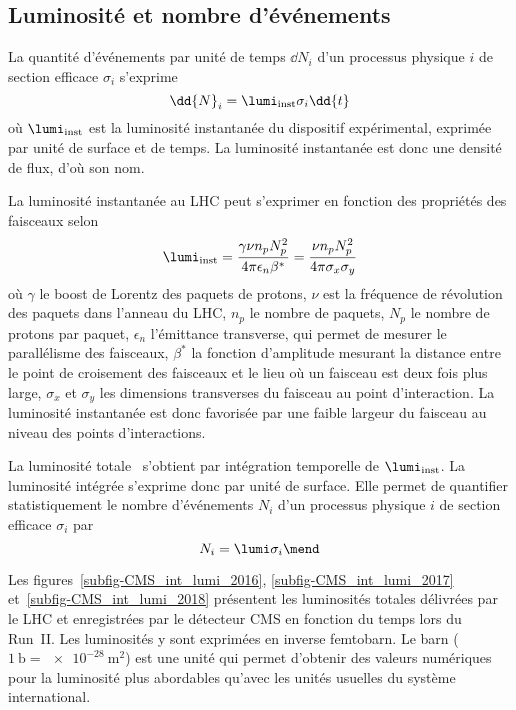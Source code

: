 \subsection{Luminosité et nombre d'événements}\label{chapter-LHC-section-LHC-subsec-lumi}
La quantité d'événements par unité de temps $\dd{N}_i$ d'un processus physique $i$ de section efficace $\sigma_i$ s'exprime
\begin{equation}
\dd{N}_i = \lumi_\text{inst} \sigma_i \dd{t}
\end{equation}
où $\lumi_\text{inst}$ est la luminosité instantanée du dispositif expérimental, exprimée par unité de surface et de temps.
La luminosité instantanée est donc une densité de flux, d'où son nom.
\par La luminosité instantanée au LHC peut s'exprimer en fonction des propriétés des faisceaux selon
\begin{equation}
\lumi_\text{inst}
= \frac{\gamma\nu n_p N_p^2}{4\pi\epsilon_n\beta^*}
= \frac{\nu n_p N_p^2}{4\pi\sigma_x\sigma_y}
\end{equation}
où
$\gamma$ le boost de Lorentz des paquets de protons,
$\nu$ est la fréquence de révolution des paquets dans l'anneau du LHC,
$n_p$ le nombre de paquets,
$N_p$ le nombre de protons par paquet,
$\epsilon_n$ l'émittance transverse, qui permet de mesurer le parallélisme des faisceaux,
$\beta^*$ la fonction d'amplitude mesurant la distance entre le point de croisement des faisceaux et le lieu où un faisceau est deux fois plus large,
$\sigma_x$ et $\sigma_y$ les dimensions transverses du faisceau au point d'interaction.
La luminosité instantanée est donc favorisée par une faible largeur du faisceau au niveau des points d'interactions.
\par La luminosité totale \lumi\ s'obtient par intégration temporelle de $\lumi_\text{inst}$.
La luminosité intégrée s'exprime donc par unité de surface.
Elle permet de quantifier statistiquement le nombre d'événements $N_i$ d'un processus physique $i$ de section efficace $\sigma_i$ par
\begin{equation}
N_i = \lumi \sigma_i
\mend
\end{equation}
\par Les figures~\ref{subfig-CMS_int_lumi_2016}, \ref{subfig-CMS_int_lumi_2017} et~\ref{subfig-CMS_int_lumi_2018} présentent les luminosités totales délivrées par le LHC et enregistrées par le détecteur CMS en fonction du temps lors du Run~II.
Les luminosités y sont exprimées en inverse femtobarn.
Le barn ($\SI{1}{\barn}=\SI{e-28}{\meter^2}$) est une unité qui permet d'obtenir des valeurs numériques pour la luminosité plus abordables qu'avec les unités usuelles du système international.
